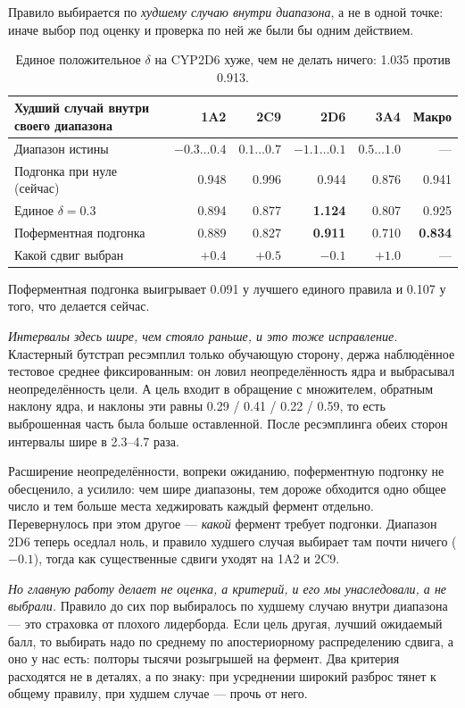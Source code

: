 Правило выбирается по \emph{худшему случаю внутри диапазона}, а не в одной точке: иначе выбор
под оценку и проверка по ней же были бы одним действием.

\begin{table}[htbp]\centering\small
\begin{tabularx}{\textwidth}{@{}Xrrrrr@{}}
\toprule
Худший случай внутри своего диапазона & 1A2 & 2C9 & 2D6 & 3A4 & Макро \\
\midrule
Диапазон истины & $-0.3\ldots0.4$ & $0.1\ldots0.7$ & $-1.1\ldots0.1$ & $0.5\ldots1.0$ & --- \\
\addlinespace[2pt]
Подгонка при нуле (сейчас)    & 0.948 & 0.996 & 0.944 & 0.876 & 0.941 \\
Единое $\delta = 0.3$         & 0.894 & 0.877 & \textbf{1.124} & 0.807 & 0.925 \\
Поферментная подгонка         & 0.889 & 0.827 & \textbf{0.911} & 0.710 & \textbf{0.834} \\
\addlinespace[2pt]
Какой сдвиг выбран & $+0.4$ & $+0.5$ & $-0.1$ & $+1.0$ & --- \\
\bottomrule
\end{tabularx}
\caption{Единое положительное $\delta$ на CYP2D6 хуже, чем не делать ничего: 1.035 против
0.913.}
\label{tab:perenz}
\end{table}

Поферментная подгонка выигрывает 0.091 у лучшего единого правила и 0.107 у того, что
делается сейчас.

\emph{Интервалы здесь шире, чем стояло раньше, и это тоже исправление.} Кластерный бутстрап
ресэмплил только обучающую сторону, держа наблюдённое тестовое среднее фиксированным: он
ловил неопределённость ядра и выбрасывал неопределённость цели. А цель входит в обращение с
множителем, обратным наклону ядра, и наклоны эти равны 0.29 / 0.41 / 0.22 / 0.59, то есть
выброшенная часть была больше оставленной. После ресэмплинга обеих сторон интервалы шире в
2.3--4.7 раза.

Расширение неопределённости, вопреки ожиданию, поферментную подгонку не обесценило, а
усилило: чем шире диапазоны, тем дороже обходится одно общее число и тем больше места
хеджировать каждый фермент отдельно. Перевернулось при этом другое --- \emph{какой} фермент
требует подгонки. Диапазон 2D6 теперь оседлал ноль, и правило худшего случая выбирает там
почти ничего ($-0.1$), тогда как существенные сдвиги уходят на 1A2 и 2C9.

\emph{Но главную работу делает не оценка, а критерий, и его мы унаследовали, а не
выбрали.} Правило до сих пор выбиралось по худшему случаю внутри диапазона --- это
страховка от плохого лидерборда. Если цель другая, лучший ожидаемый балл, то выбирать надо
по среднему по апостериорному распределению сдвига, а оно у нас есть: полторы тысячи
розыгрышей на фермент. Два критерия расходятся не в деталях, а по знаку: при усреднении
широкий разброс тянет к общему правилу, при худшем случае --- прочь от него.


